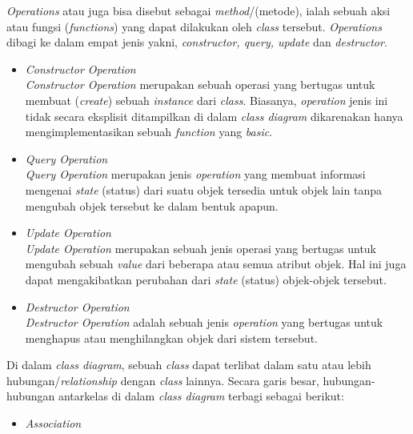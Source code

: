 \documentclass[a4paper]{article}
\begin{document}
\begin{enumerate}
\begin{itemize}
        \textit{Operations} atau juga bisa disebut sebagai \textit{method}/(metode), ialah sebuah aksi atau fungsi (\textit{functions}) yang dapat dilakukan oleh \textit{class} tersebut. \textit{Operations} dibagi ke dalam empat jenis yakni, \textit{constructor, query, update} dan \textit{destructor}\autocite{systemanalysisdesign-class-diagram}.
        \begin{itemize}
            \item \textit{Constructor Operation}\\
            \textit{Constructor Operation} merupakan sebuah operasi yang bertugas untuk membuat (\textit{create}) sebuah \textit{instance} dari \textit{class}. Biasanya, \textit{operation} jenis ini tidak secara eksplisit ditampilkan di dalam \textit{class diagram} dikarenakan hanya mengimplementasikan sebuah \textit{function} yang \textit{basic}\autocite{systemanalysisdesign-class-diagram}.
            \item \textit{Query Operation}\\
            \textit{Query Operation} merupakan jenis \textit{operation} yang membuat informasi mengenai \textit{state} (status) dari suatu objek tersedia untuk objek lain tanpa mengubah objek tersebut ke dalam bentuk apapun\autocite{systemanalysisdesign-class-diagram}.
            \item \textit{Update Operation}\\
            \textit{Update Operation} merupakan sebuah jenis operasi yang bertugas untuk mengubah sebuah \textit{value} dari beberapa atau semua atribut objek. Hal ini juga dapat mengakibatkan perubahan dari \textit{state} (status) objek-objek tersebut\autocite{systemanalysisdesign-class-diagram}.
            \item \textit{Destructor Operation}\\
            \textit{Destructor Operation} adalah sebuah jenis \textit{operation} yang bertugas untuk menghapus atau menghilangkan objek dari sistem tersebut\autocite{systemanalysisdesign-class-diagram}.
        \end{itemize}
    \end{itemize}
    Di dalam \textit{class diagram}, sebuah \textit{class} dapat terlibat dalam satu atau lebih hubungan/\textit{relationship} dengan \textit{class} lainnya. Secara garis besar, hubungan-hubungan antarkelas di dalam \textit{class diagram} terbagi sebagai berikut:
    \begin{itemize}
        \item \textit{Association}\\

\end{itemize}
\end{enumerate}
\end{document}
